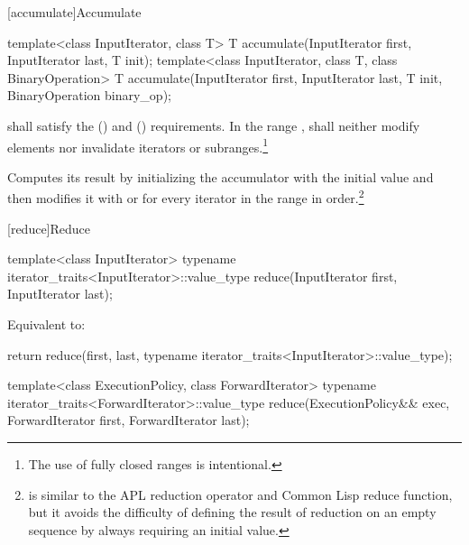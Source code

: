 [accumulate]{Accumulate}

%
\begin{itemdecl}
template<class InputIterator, class T>
  T accumulate(InputIterator first, InputIterator last, T init);
template<class InputIterator, class T, class BinaryOperation>
  T accumulate(InputIterator first, InputIterator last, T init,
               BinaryOperation binary_op);
\end{itemdecl}

\begin{itemdescr}
\pnum
\requires
{} shall satisfy the  ()
and  () requirements.
In the range
,
shall neither modify elements nor invalidate iterators or subranges.\footnote{The use of fully closed ranges is intentional.}

\pnum
\effects
Computes its result by initializing the accumulator
with the initial value
and then modifies it with
or
for every iterator
in the range 
in order.\footnote{
is similar to the APL reduction operator and Common Lisp reduce function, but
it avoids the difficulty of defining the result of reduction on an empty
sequence by always requiring an initial value.}
\end{itemdescr}

[reduce]{Reduce}

%
\begin{itemdecl}
template<class InputIterator>
  typename iterator_traits<InputIterator>::value_type
    reduce(InputIterator first, InputIterator last);
\end{itemdecl}

\begin{itemdescr}
\pnum
\effects Equivalent to:
\begin{codeblock}
return reduce(first, last,
              typename iterator_traits<InputIterator>::value_type{});
\end{codeblock}
\end{itemdescr}

%
\begin{itemdecl}
template<class ExecutionPolicy, class ForwardIterator>
  typename iterator_traits<ForwardIterator>::value_type
    reduce(ExecutionPolicy&& exec,
           ForwardIterator first, ForwardIterator last);
\end{itemdecl}

